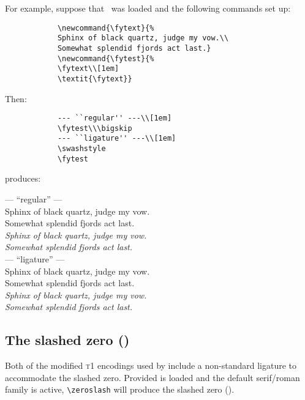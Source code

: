 \documentclass[11pt,british]{article}
\begin{document}
	For example, suppose that \ was loaded and the following commands set up:
		\begin{verbatim}
			\newcommand{\fytext}{%
			Sphinx of black quartz, judge my vow.\\
			Somewhat splendid fjords act last.}
			\newcommand{\fytest}{%
			\fytext\\[1em]
			\textit{\fytext}}
		\end{verbatim}
			\newcommand{\fytext}{%
			Sphinx of black quartz, judge my vow.\\
			Somewhat splendid fjords act last.}
			\newcommand{\fytest}{%
			\fytext\\[1em]
			\textit{\fytext}}
		Then:
		\begin{verbatim}
			--- ``regular'' ---\\[1em]
			\fytest\\\bigskip
			--- ``ligature'' ---\\[1em]
			\swashstyle			
			\fytest
		\end{verbatim}
		produces:
		\begin{center}
			--- ``regular'' ---\\[1em]
			\fytest\\\bigskip
			--- ``ligature'' ---\\[1em]
			\swashstyle			
			\fytest
		\end{center}
		
\subsection{The slashed zero (\zeroslash)}

Both of the modified \textsc{t1} encodings used by  include a non-standard ligature to accommodate the slashed zero. Provided  is loaded and the default serif/roman family is active, \verb|\zeroslash| will produce the slashed zero (\zeroslash). 
	
\end{document}
